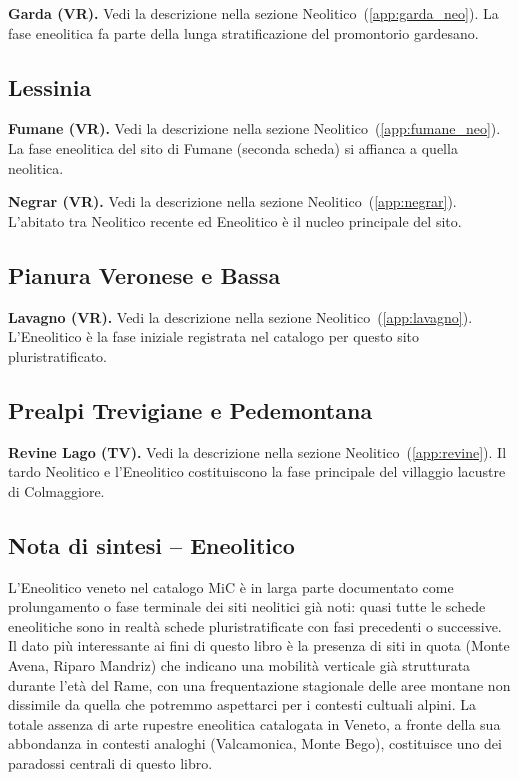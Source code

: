\textbf{Garda (VR).} Vedi la descrizione nella sezione Neolitico~(\ref{app:garda_neo}). La fase eneolitica fa parte della lunga stratificazione del promontorio gardesano.

\subsection{Lessinia}

\textbf{Fumane (VR).} Vedi la descrizione nella sezione Neolitico~(\ref{app:fumane_neo}). La fase eneolitica del sito di Fumane (seconda scheda) si affianca a quella neolitica.

\textbf{Negrar (VR).} Vedi la descrizione nella sezione Neolitico~(\ref{app:negrar}). L'abitato tra Neolitico recente ed Eneolitico è il nucleo principale del sito.

\subsection{Pianura Veronese e Bassa}

\textbf{Lavagno (VR).} Vedi la descrizione nella sezione Neolitico~(\ref{app:lavagno}). L'Eneolitico è la fase iniziale registrata nel catalogo per questo sito pluristratificato.

\subsection{Prealpi Trevigiane e Pedemontana}

\textbf{Revine Lago (TV).} Vedi la descrizione nella sezione Neolitico~(\ref{app:revine}). Il tardo Neolitico e l'Eneolitico costituiscono la fase principale del villaggio lacustre di Colmaggiore.

\subsection*{Nota di sintesi -- Eneolitico}

L'Eneolitico veneto nel catalogo MiC è in larga parte documentato come prolungamento o fase terminale dei siti neolitici già noti: quasi tutte le schede eneolitiche sono in realtà schede pluristratificate con fasi precedenti o successive. Il dato più interessante ai fini di questo libro è la presenza di siti in quota (Monte Avena, Riparo Mandriz) che indicano una mobilità verticale già strutturata durante l'età del Rame, con una frequentazione stagionale delle aree montane non dissimile da quella che potremmo aspettarci per i contesti cultuali alpini. La totale assenza di arte rupestre eneolitica catalogata in Veneto, a fronte della sua abbondanza in contesti analoghi (Valcamonica, Monte Bego), costituisce uno dei paradossi centrali di questo libro.


